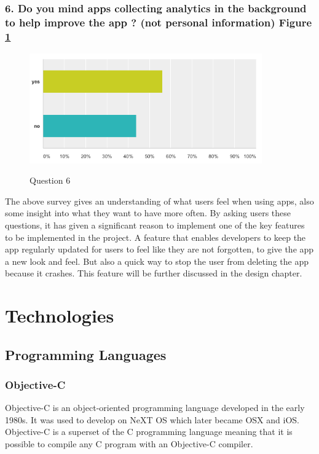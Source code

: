 \subsubsection{6. Do you mind apps collecting analytics in the background to help improve the app ? (not personal information) Figure \ref{fig:label6} }

\begin{figure}[!h]
    \caption{Question 6}
    \centering
    \includegraphics[width=100mm]{images/survey/analytics}
    \label{fig:label6}
\end{figure}


The above survey gives an understanding of what users feel when using apps, also some insight into what they want to have more often. By asking users these questions, it has given a significant reason to implement one of the key features to be implemented in the project. A feature that enables developers to keep the app regularly updated for users to feel like they are not forgotten, to give the app a new look and feel. But also a quick way to stop the user from deleting the app because it crashes. This feature will be further discussed in the design chapter.



\section{Technologies}

\subsection{Programming Languages}

\subsubsection{Objective-C}
Objective-C \cite{objectiveC}  is an object-oriented programming language developed in the early 1980s. It was used to develop on NeXT OS which later became OSX and iOS. Objective-C is a superset of the C programming language meaning that it is possible to compile any C program with an Objective-C compiler. 

